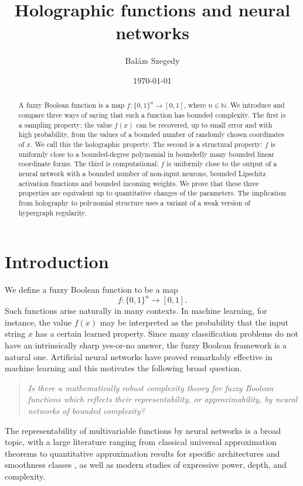 \documentclass[11pt]{amsart}
\title[Holographic functions and neural networks]{Holographic functions and neural networks}
\author{Bal\'azs Szegedy}
\date{\today}
\newcommand{\1}{\mathbf 1}
\newcommand{\cube}{\{0,1\}}
\begin{document}
\maketitle

\begin{abstract}
A fuzzy Boolean function is a map $f:\cube^n\to [0,1]$, where $n\in\mathbb N$.  We introduce and compare three ways of saying that such a function has bounded complexity.  The first is a sampling property: the value $f(x)$ can be recovered, up to small error and with high probability, from the values of a bounded number of randomly chosen coordinates of $x$.  We call this the holographic property.  The second is a structural property: $f$ is uniformly close to a bounded-degree polynomial in boundedly many bounded linear coordinate forms. The third is computational: $f$ is uniformly close to the output of a neural network with a bounded number of non-input neurons, bounded Lipschitz activation functions and bounded incoming weights.  We prove that these three properties are equivalent up to quantitative changes of the parameters.  The implication from holography to polynomial structure uses a variant of a weak version of hypergraph regularity. 
\end{abstract}

\section{Introduction} 
We define a fuzzy Boolean function to be a map
\[
        f:\cube^n\longrightarrow [0,1].
\]
Such functions arise naturally in many contexts.  In machine learning, for
instance, the value \(f(x)\) may be interpreted as the probability that the
input string \(x\) has a certain learned property.  Since many classification problems do not
have an intrinsically sharp yes-or-no answer, the fuzzy Boolean framework is a
natural one. Artificial neural networks have proved remarkably effective in machine learning and this motivates the following broad question.

\begin{quote}
\itshape
Is there a mathematically robust complexity theory for fuzzy Boolean functions
which reflects their representability, or approximability, by neural networks
of bounded complexity?
\end{quote}

The representability of multivariable functions by neural networks is a broad
topic, with a large literature ranging from classical universal approximation
theorems \cite{Cybenko,Hornik,Pinkus} to quantitative approximation results for
specific architectures and smoothness classes \cite{Yarotsky}, as well as
modern studies of expressive power, depth, and complexity.
\end{document}
